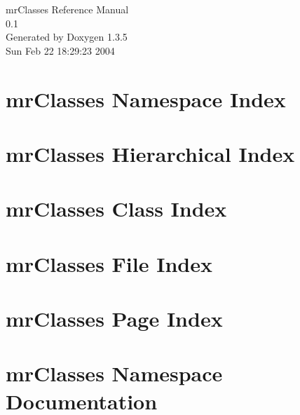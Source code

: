\documentclass[a4paper]{book}
\begin{document}
\begin{titlepage}
\vspace*{7cm}
\begin{center}
{\Large mr\-Classes Reference Manual\\[1ex]\large 0.1 }\\
\vspace*{1cm}
{\large Generated by Doxygen 1.3.5}\\
\vspace*{0.5cm}
{\small Sun Feb 22 18:29:23 2004}\\
\end{center}
\end{titlepage}
\clearemptydoublepage
{}
\tableofcontents
\clearemptydoublepage
{}
\chapter{mr\-Classes Namespace Index}

\chapter{mr\-Classes Hierarchical Index}

\chapter{mr\-Classes Class Index}

\chapter{mr\-Classes File Index}

\chapter{mr\-Classes Page Index}

\chapter{mr\-Classes Namespace Documentation}







\end{document}
